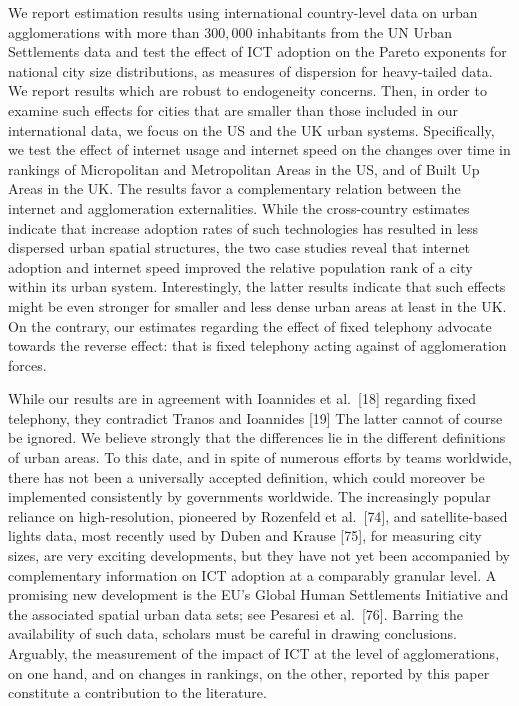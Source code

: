 \documentclass[10pt,letterpaper]{article}
\begin{document}
We report estimation results using international country-level data on
urban agglomerations with more than \(300,000\) inhabitants from the UN
Urban Settlements data and test the effect of ICT adoption on the Pareto
exponents for national city size distributions, as measures of
dispersion for heavy-tailed data. We report results which are robust to
endogeneity concerns. Then, in order to examine such effects for cities
that are smaller than those included in our international data, we focus
on the US and the UK urban systems. Specifically, we test the effect of
internet usage and internet speed on the changes over time in rankings
of Micropolitan and Metropolitan Areas in the US, and of Built Up Areas
in the UK. The results favor a complementary relation between the
internet and agglomeration externalities. While the cross-country
estimates indicate that increase adoption rates of such technologies has
resulted in less dispersed urban spatial structures, the two case
studies reveal that internet adoption and internet speed improved the
relative population rank of a city within its urban system.
Interestingly, the latter results indicate that such effects might be
even stronger for smaller and less dense urban areas at least in the UK.
On the contrary, our estimates regarding the effect of fixed telephony
advocate towards the reverse effect: that is fixed telephony acting
against of agglomeration forces.

While our results are in agreement with Ioannides et al.~{[}18{]}
regarding fixed telephony, they contradict Tranos and Ioannides {[}19{]}
The latter cannot of course be ignored. We believe strongly that the
differences lie in the different definitions of urban areas. To this
date, and in spite of numerous efforts by teams worldwide, there has not
been a universally accepted definition, which could moreover be
implemented consistently by governments worldwide. The increasingly
popular reliance on high-resolution, pioneered by Rozenfeld et
al.~{[}74{]}, and satellite-based lights data, most recently used by
Duben and Krause {[}75{]}, for measuring city sizes, are very exciting
developments, but they have not yet been accompanied by complementary
information on ICT adoption at a comparably granular level. A promising
new development is the EU's Global Human Settlements Initiative and the
associated spatial urban data sets; see Pesaresi et al.~{[}76{]}.
Barring the availability of such data, scholars must be careful in
drawing conclusions. Arguably, the measurement of the impact of ICT at
the level of agglomerations, on one hand, and on changes in rankings, on
the other, reported by this paper constitute a contribution to the
literature.
\end{document}

